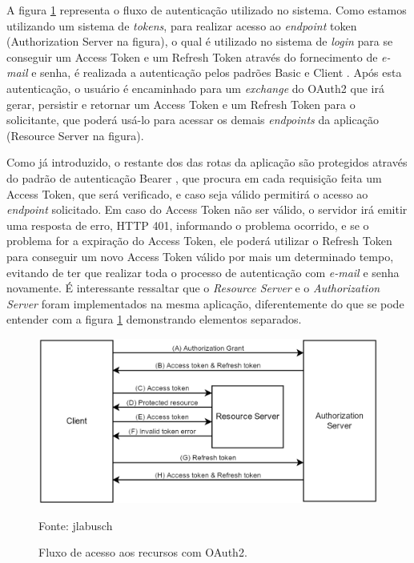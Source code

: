 A figura \ref{fig:oauth2} representa o fluxo de autenticação utilizado no sistema. Como estamos utilizando um sistema de \textit{tokens}, para realizar acesso ao \textit{endpoint} token (Authorization Server na figura), o qual é utilizado no sistema de \textit{login} para se conseguir um Access Token e um Refresh Token através do fornecimento de \textit{e-mail} e senha, é realizada a autenticação pelos padrões Basic \cite{passport-basic} e Client \cite{passport-client}. Após esta autenticação, o usuário é encaminhado para um \textit{exchange} do OAuth2 que irá gerar, persistir e retornar um Access Token e um Refresh Token para o solicitante, que poderá usá-lo para acessar os demais \textit{endpoints} da aplicação (Resource Server na figura).

Como já introduzido, o restante dos das rotas da aplicação são protegidos através do padrão de autenticação Bearer \cite{passport-bearer}, que procura em cada requisição feita um Access Token, que será verificado, e caso seja válido permitirá o acesso ao \textit{endpoint} solicitado. Em caso do Access Token não ser válido, o servidor irá emitir uma resposta de erro, HTTP 401, informando o problema ocorrido, e se o problema for a expiração do Access Token, ele poderá utilizar o Refresh Token para conseguir um novo Access Token válido por mais um determinado tempo, evitando de ter que realizar toda o processo de autenticação com \textit{e-mail} e senha novamente. É interessante ressaltar que o \textit{Resource Server} e o \textit{Authorization Server} foram implementados na mesma aplicação, diferentemente do que se pode entender com a figura \ref{fig:oauth2} demonstrando elementos separados.

\begin{figure}[H]
	\centering
	\includegraphics[scale=0.49]{imagens/oauth2.png}
	\caption{\small Fluxo de acesso aos recursos com OAuth2.} Fonte: jlabusch \cite{img-jlabusch}
	\label{fig:oauth2}
\end{figure}

